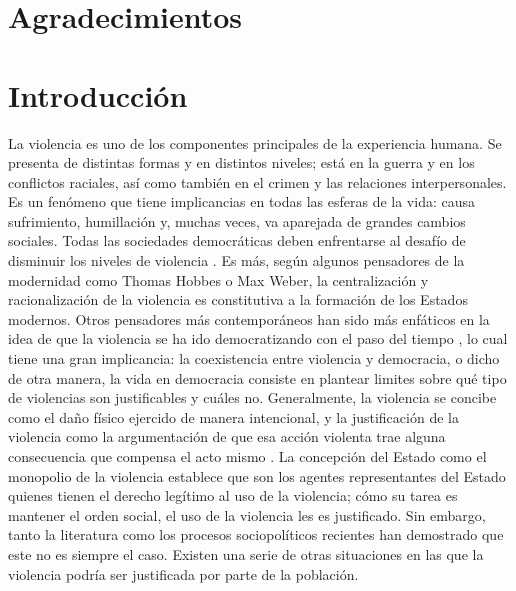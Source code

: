 \documentclass[12pt,twoside]{templates/facsothesis}
\begin{document}
\hypertarget{agradecimientos}{%
\chapter*{Agradecimientos}\label{agradecimientos}}

\hypertarget{introducciuxf3n}{%
\chapter{Introducción}\label{introducciuxf3n}}

La violencia es uno de los componentes principales de la experiencia humana. Se presenta de distintas formas y en distintos niveles; está en la guerra y en los conflictos raciales, así como también en el crimen y las relaciones interpersonales. Es un fenómeno que tiene implicancias en todas las esferas de la vida: causa sufrimiento, humillación y, muchas veces, va aparejada de grandes cambios sociales. Todas las sociedades democráticas deben enfrentarse al desafío de disminuir los niveles de violencia \citep{Gerber2017, Keane2004}. Es más, según algunos pensadores de la modernidad como Thomas Hobbes o Max Weber, la centralización y racionalización de la violencia es constitutiva a la formación de los Estados modernos. Otros pensadores más contemporáneos han sido más enfáticos en la idea de que la violencia se ha ido democratizando con el paso del tiempo \citep{Keane2004}, lo cual tiene una gran implicancia: la coexistencia entre violencia y democracia, o dicho de otra manera, la vida en democracia consiste en plantear limites sobre qué tipo de violencias son justificables y cuáles no. Generalmente, la violencia se concibe como el daño físico ejercido de manera intencional, y la justificación de la violencia como la argumentación de que esa acción violenta trae alguna consecuencia que compensa el acto mismo \citep{Frazer2020}. La concepción del Estado como el monopolio de la violencia \citep[1919{]}]{Weber1996} establece que son los agentes representantes del Estado quienes tienen el derecho legítimo al uso de la violencia; cómo su tarea es mantener el orden social, el uso de la violencia les es justificado. Sin embargo, tanto la literatura como los procesos sociopolíticos recientes han demostrado que este no es siempre el caso. Existen una serie de otras situaciones en las que la violencia podría ser justificada por parte de la población.
\end{document}
